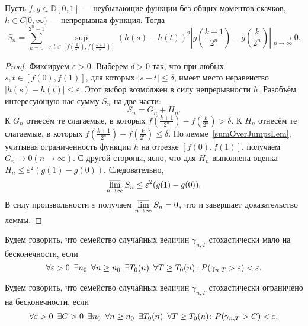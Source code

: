 \documentclass[12pt, a4paper, titlepage]{article}
\begin{document}
  \begin{lem}
  Пусть $f, g \in \mathbb{D}[0,1]$ --- неубывающие функции без общих
  моментов скачков, $h\in C[0,\infty)$ --- непрерывная функция. Тогда
 $$S_n=\sum\limits_{k=0}^{2^n-1}
 \sup\limits_{s,t \in [f(\frac{k}{2^n}), f(\frac{k+1}{2^n})]}(h(s)-h(t))^2
 \left|g\left(\frac{k+1}{2^n}\right)-g\left(\frac{k}{2^n}\right)\right|\xrightarrow[n\to\infty]{}0. 
 $$
 \end{lem}
 \begin{proof}
 Фиксируем $\varepsilon>0$. Выберем $\delta>0$ так, что при любых $s,t \in [f(0), f(1)]$,
 для которых $|s-t| \le \delta$, имеет место неравенство $|h(s)-h(t)| \le \varepsilon$.
 Этот выбор возмолжен в силу непрерывности $h$. 
 Разобъём интересующую нас сумму $S_n$ на две части:
 $$S_n=G_n+H_n.$$
 К $G_n$ отнесём те слагаемые, в которых 
 $f(\frac{k+1}{2^n})-f(\frac{k}{2^n}) > \delta.$
 К $H_n$ отнесём те слагаемые, в которых 
 $f(\frac{k+1}{2^n})-f(\frac{k}{2^n}) \le \delta.$
 По лемме~\ref{sumOverJumpsLem}, учитывая ограниченность функции $h$
 на отрезке $[f(0), f(1)]$, получаем $G_n \to 0 (n \to \infty).$
 С другой стороны, ясно, что для $H_n$ выполнена оценка
 $H_n \le \varepsilon^2(g(1)-g(0)).$
 Следовательно,
 $$\varlimsup\limits_{n\to \infty}S_n \le \varepsilon^2(g(1)-g(0)).$$
 В силу произвольности $\varepsilon$ получаем 
 $\varlimsup\limits_{n\to \infty}S_n = 0$, что и завершает доказательство леммы.
 \end{proof}
 
 \begin{definition}
 Будем говорить, что семейство случайных величин $\gamma_{n,T}$
 стохастически мало на бесконечности, если
  $$\forall \varepsilon>0 \enskip \exists n_0 \enskip
    \forall n \ge n_0 \enskip \exists T_0(n)\enskip \forall T \ge T_0(n) \colon
    P(\gamma_{n, T}>\varepsilon)<\varepsilon.$$
 \end{definition}

  \begin{definition}
 Будем говорить, что семейство случайных величин $\gamma_{n,T}$
 стохастически ограничено на бесконечности, если
  $$\forall \varepsilon>0 \enskip \exists C>0 \enskip \exists n_0 \enskip
    \forall n \ge n_0 \enskip \exists T_0(n)\enskip \forall T \ge T_0(n) \colon
    P(\gamma_{n, T}>C)<\varepsilon.$$
 \end{definition}
 
\end{document}
